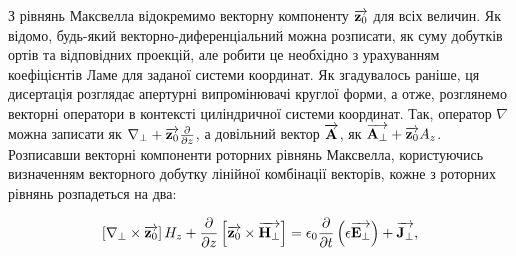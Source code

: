 З рівнянь Максвелла відокремимо векторну компоненту $ \overrightarrow{\mathbf z_0} $ для всіх 
величин. Як відомо, будь-який векторно-диференціальний можна 
розписати, як суму добутків ортів та відповідних проекцій, але робити це 
необхідно з урахуванням коефіцієнтів Ламе \cite{imp:Korn1974} для заданої 
системи координат. Як згадувалось раніше, ця дисертація розглядає апертурні 
випромінювачі круглої форми, а отже, розглянемо векторні оператори в контексті 
циліндричної системи координат. Так, оператор $ \nabla $ можна записати як 
$ \nabla_\perp + \overrightarrow{\mathbf z_0} \frac{\partial }{\partial z} $, а довільний вектор
$ \overrightarrow{\mathbf A} $, як $ \overrightarrow{\mathbf A_\perp} + \overrightarrow{\mathbf z_0} A_z $. Розписавши векторні 
компоненти роторних рівнянь Максвелла, користуючись визначенням векторного 
добутку лінійної комбінації векторів, кожне з роторних рівнянь розпадеться 
на два:

%
%
\begin{equation} \label{eq:rotHt} 
\left[ \nabla_\perp \times \overrightarrow{\mathbf z_0} \right] H_z +
\frac{\partial }{\partial z} \left[ \overrightarrow{\mathbf z_0} \times \overrightarrow{\mathbf H_\perp} \right] =
\epsilon_0 \frac{\partial }{\partial t} \left( \epsilon  \overrightarrow{\mathbf E_\perp} \right) + 
\overrightarrow{\mathbf J_\perp},
\end{equation}
